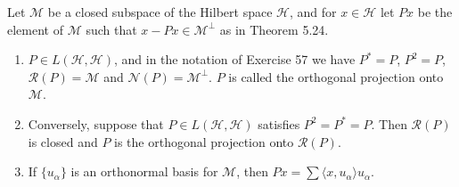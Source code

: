 \documentclass[12pt,a4paper]{article}
\begin{document}
\begin{problem}\label{prob:5-58}
Let $\mathcal{M}$ be a closed subspace of the Hilbert space $\mathcal{H}$, and for $x \in \mathcal{H}$ let $Px$ be the element of $\mathcal{M}$ such that $x - Px \in \mathcal{M}^\perp$ as in Theorem 5.24.
\begin{enumerate}[label=\alph*.]
\item $P \in L(\mathcal{H},\mathcal{H})$, and in the notation of Exercise 57 we have $P^*=P$, $P^2=P$, $\mathcal{R}(P)=\mathcal{M}$ and $\mathcal{N}(P)=\mathcal{M}^\perp$. $P$ is called the orthogonal projection onto $\mathcal{M}$.
\item Conversely, suppose that $P \in L(\mathcal{H},\mathcal{H})$ satisfies $P^2 = P^* = P$. Then $\mathcal{R}(P)$ is closed and $P$ is the orthogonal projection onto $\mathcal{R}(P)$.
\item If $\{u_\alpha\}$ is an orthonormal basis for $\mathcal{M}$, then $Px = \sum \langle x,u_\alpha \rangle u_\alpha$.
\end{enumerate}
\end{problem}
\end{document}
